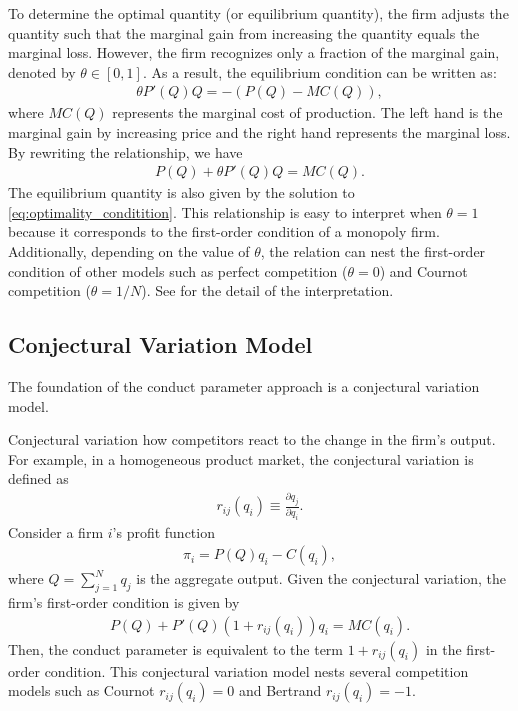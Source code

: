 \documentclass[11pt, a4paper]{article}
\theoremstyle{remark}
\begin{document}
To determine the optimal quantity (or equilibrium quantity), the firm adjusts the quantity such that the marginal gain from increasing the quantity equals the marginal loss. 
However, the firm recognizes only a fraction of the marginal gain, denoted by $\theta \in [0,1]$. 
As a result, the equilibrium condition can be written as:
\begin{align}
    \theta P'(Q)Q = - (P(Q) - MC(Q)),
\end{align}
where $MC(Q)$ represents the marginal cost of production.
The left hand is the marginal gain by increasing price and the right hand represents the marginal loss.
By rewriting the relationship, we have
\begin{align}
    P(Q)+ \theta P'(Q)Q = MC(Q). \label{eq:optimality_conditition}
\end{align}
The equilibrium quantity is also given by the solution to \eqref{eq:optimality_conditition}.
This relationship is easy to interpret when $\theta = 1$ because it corresponds to the first-order condition of a monopoly firm.
Additionally, depending on the value of $\theta$, the relation can nest the first-order condition of other models such as perfect competition ($\theta=0$) and Cournot competition ($\theta=1/N$). See \citet{adachiMicrofoundation2023} for the detail of the interpretation.


\subsection{Conjectural Variation Model}



The foundation of the conduct parameter approach is a conjectural variation model.

Conjectural variation how competitors react to the change in the firm's output.
For example, in a homogeneous product market, the conjectural variation is defined as
\begin{align}
    r_{ij}(q_i) \equiv \frac{\partial q_j}{\partial q_i}.
\end{align}
Consider a firm $i$'s profit function
\begin{align}
    \pi_i = P(Q)q_i - C(q_i),
\end{align}
where $Q = \sum_{j=1}^N q_j$ is the aggregate output.
Given the conjectural variation, the firm's first-order condition is given by
\begin{align}
    P(Q) + P'(Q)(1+r_{ij}(q_i))q_i = MC(q_i).
\end{align}
Then, the conduct parameter is equivalent to the term $1+r_{ij}(q_i)$ in the first-order condition.
This conjectural variation model nests several competition models such as Cournot $r_{ij}(q_i) = 0$ and Bertrand $r_{ij}(q_i) = -1$.
\end{document}
